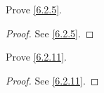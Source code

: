 \exercisesection

\begin{ex}\label{ex:6.2.1}
  Prove \cref{6.2.5}.
\end{ex}

\begin{proof}
  See \cref{6.2.5}.
\end{proof}

\begin{ex}\label{ex:6.2.2}
  Prove \cref{6.2.11}.
\end{ex}

\begin{proof}
  See \cref{6.2.11}.
\end{proof}
